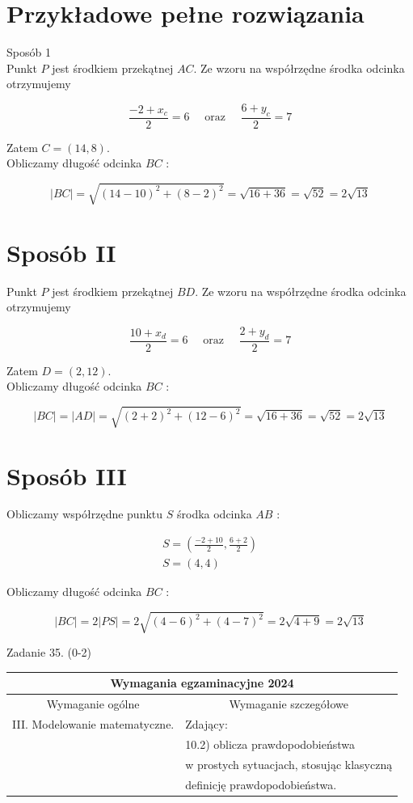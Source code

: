 \documentclass[10pt]{article}
\begin{document}
\section*{Przykładowe pełne rozwiązania}
Sposób 1\\
Punkt $P$ jest środkiem przekątnej $A C$. Ze wzoru na współrzędne środka odcinka otrzymujemy

$$
\frac{-2+x_{c}}{2}=6 \quad \text { oraz } \quad \frac{6+y_{c}}{2}=7
$$

Zatem $C=(14,8)$.\\
Obliczamy długość odcinka $B C$ :

$$
|B C|=\sqrt{(14-10)^{2}+(8-2)^{2}}=\sqrt{16+36}=\sqrt{52}=2 \sqrt{13}
$$

\section*{Sposób II}
Punkt $P$ jest środkiem przekątnej $B D$. Ze wzoru na współrzędne środka odcinka otrzymujemy

$$
\frac{10+x_{d}}{2}=6 \quad \text { oraz } \quad \frac{2+y_{d}}{2}=7
$$

Zatem $D=(2,12)$.\\
Obliczamy długość odcinka $B C$ :

$$
|B C|=|A D|=\sqrt{(2+2)^{2}+(12-6)^{2}}=\sqrt{16+36}=\sqrt{52}=2 \sqrt{13}
$$

\section*{Sposób III}
Obliczamy współrzędne punktu $S$ środka odcinka $A B$ :

$$
\begin{gathered}
S=\left(\frac{-2+10}{2}, \frac{6+2}{2}\right) \\
S=(4,4)
\end{gathered}
$$

Obliczamy długość odcinka $B C$ :

$$
|B C|=2|P S|=2 \sqrt{(4-6)^{2}+(4-7)^{2}}=2 \sqrt{4+9}=2 \sqrt{13}
$$

Zadanie 35. (0-2)

\begin{center}
\begin{tabular}{|l|l|}
\hline
\multicolumn{2}{|c|}{Wymagania egzaminacyjne 2024} \\
\hline
\multicolumn{1}{|c|}{Wymaganie ogólne} & \multicolumn{1}{c|}{Wymaganie szczegółowe} \\
\hline
III. Modelowanie matematyczne. & Zdający: \\
 & 10.2) oblicza prawdopodobieństwa \\
 & w prostych sytuacjach, stosując klasyczną \\
 & definicję prawdopodobieństwa. \\
\hline
\end{tabular}
\end{center}
\end{document}
